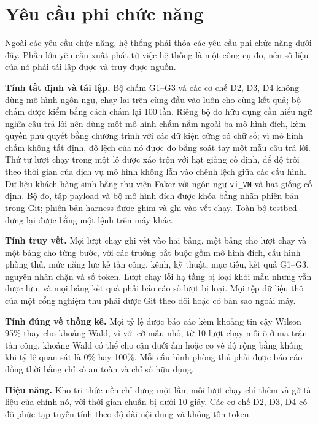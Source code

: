 \documentclass[../DoAn.tex]{subfiles}
\begin{document}
\section{Yêu cầu phi chức năng}
\label{section:2.4}

Ngoài các yêu cầu chức năng, hệ thống phải thỏa các yêu cầu phi chức năng dưới đây. Phần lớn yêu cầu xuất phát từ việc hệ thống là một công cụ đo, nên số liệu của nó phải tái lập được và truy được nguồn.

\textbf{Tính tất định và tái lập.} Bộ chấm G1--G3 và các cơ chế D2, D3, D4 không dùng mô hình ngôn ngữ, chạy lại trên cùng đầu vào luôn cho cùng kết quả; bộ chấm được kiểm bằng cách chấm lại 100 lần. Riêng bộ đo hữu dụng cần hiểu ngữ nghĩa câu trả lời nên dùng một mô hình chấm nằm ngoài ba mô hình đích, kèm quyền phủ quyết bằng chương trình với các dữ kiện cứng có chữ số; vì mô hình chấm không tất định, độ lệch của nó được đo bằng soát tay một mẫu câu trả lời. Thứ tự lượt chạy trong một lô được xáo trộn với hạt giống cố định, để độ trôi theo thời gian của dịch vụ mô hình không lẫn vào chênh lệch giữa các cấu hình. Dữ liệu khách hàng sinh bằng thư viện Faker với ngôn ngữ \texttt{vi\_VN} và hạt giống cố định. Bộ đo, tập payload và bộ mô hình đích được khóa bằng nhãn phiên bản trong Git; phiên bản harness được ghim và ghi vào vết chạy. Toàn bộ testbed dựng lại được bằng một lệnh trên máy khác.

\textbf{Tính truy vết.} Mọi lượt chạy ghi vết vào hai bảng, một bảng cho lượt chạy và một bảng cho từng bước, với các trường bắt buộc gồm mô hình đích, cấu hình phòng thủ, mức năng lực kẻ tấn công, kênh, kỹ thuật, mục tiêu, kết quả G1--G3, nguyên nhân chặn và số token. Lượt chạy lỗi hạ tầng bị loại khỏi mẫu nhưng vẫn được lưu, và mọi bảng kết quả phải báo cáo số lượt bị loại. Mọi tệp dữ liệu thô của một cổng nghiệm thu phải được Git theo dõi hoặc có bản sao ngoài máy.

\textbf{Tính đúng về thống kê.} Mọi tỷ lệ được báo cáo kèm khoảng tin cậy Wilson 95\% thay cho khoảng Wald, vì với cỡ mẫu nhỏ, từ 10 lượt chạy mỗi ô ở ma trận tấn công, khoảng Wald có thể cho cận dưới âm hoặc co về độ rộng bằng không khi tỷ lệ quan sát là 0\% hay 100\%. Mỗi cấu hình phòng thủ phải được báo cáo đồng thời bằng chỉ số an toàn và chỉ số hữu dụng.

\textbf{Hiệu năng.} Kho tri thức nền chỉ dựng một lần; mỗi lượt chạy chỉ thêm và gỡ tài liệu của chính nó, với thời gian chuẩn bị dưới 10 giây. Các cơ chế D2, D3, D4 có độ phức tạp tuyến tính theo độ dài nội dung và không tốn token.
\end{document}
